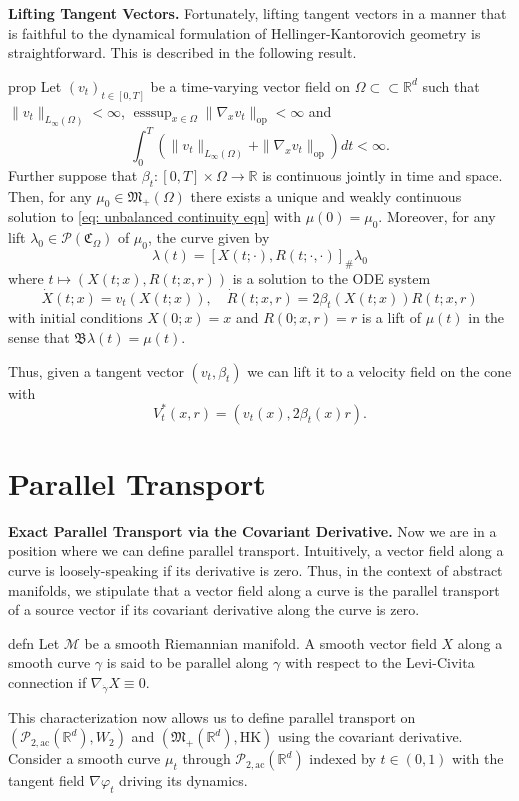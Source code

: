 \documentclass{article}
\newcommand{\man}{\mathcal{M}}
\DeclareMathOperator{\esssup}{esssup}
\newcommand{\pac}{\mathcal{P}_{2, \text{ac}}(\mathbb{R}^d)}
\newcommand{\posm}{\mathfrak{M}_+(\mathbb{R}^d)}
\begin{document}
\noindent \textbf{Lifting Tangent Vectors.} Fortunately, lifting tangent vectors in a manner that is faithful to the dynamical formulation of Hellinger-Kantorovich geometry is straightforward. This is described in the following result.

\begin{restatable}{prop}{} \label{lifting velocities}
    Let $(v_t)_{t \in [0, T]}$ be a time-varying vector field on $\Omega \subset \subset \mathbb{R}^d$ such that $\|v_t\|_{L_\infty(\Omega)} < \infty$, $\esssup_{x \in \Omega}\|\nabla_xv_t\|_{\text{op}} < \infty$ and 
    \[\int_0^T \left(\|v_t\|_{L_\infty(\Omega)} + \|\nabla_xv_t\|_{\text{op}}\right)dt < \infty.\]
    Further suppose that $\beta_t: [0, T] \times \Omega \rightarrow \mathbb{R}$ is continuous jointly in time and space. Then, for any $\mu_0 \in \mathfrak{M}_+(\Omega)$ there exists a unique and weakly continuous solution to \cref{eq: unbalanced continuity eqn} with $\mu(0) = \mu_0$. Moreover, for any lift $\lambda_0 \in \mathcal{P}(\mathfrak{C}_\Omega)$ of $\mu_0$, the curve given by 
    \[\lambda(t) = \left[X(t; \cdot), R(t; \cdot, \cdot)\right]_{\#} \lambda_0\]
    where $t \mapsto \left(X(t;x), R(t; x, r)\right)$ is a solution to the ODE system
    \[\dot X(t; x) = v_t(X(t;x)), \quad \dot R(t; x, r) = 2\beta_t(X(t; x))R(t; x, r)\]
    with initial conditions $X(0; x) = x$ and $R(0; x, r) = r$ is a lift of $\mu(t)$ in the sense that $\mathfrak{B}\lambda(t) = \mu(t)$. 
\end{restatable}
\noindent Thus, given a tangent vector $(v_t, \beta_t)$ we can lift it to a velocity field on the cone with 
\[V_t^*(x, r) = \left(v_t(x), 2\beta_t(x)r\right).\]

\section{Parallel Transport}

\textbf{Exact Parallel Transport via the Covariant Derivative.} Now we are in a position where we can define parallel transport. Intuitively, a vector field along a curve is  loosely-speaking if its derivative is zero. Thus, in the context of abstract manifolds, we stipulate that a vector field along a curve is the parallel transport of a source vector if its covariant derivative along the curve is zero.
\begin{restatable}{defn}{} \label{parallel transport on general manifolds}
    Let $\man$ be a smooth Riemannian manifold. A smooth vector field $X$ along a smooth curve $\gamma$ is said to be parallel along $\gamma$ with respect to the Levi-Civita connection if $\nabla_{\dot \gamma}X \equiv 0$.
\end{restatable}
This characterization now allows us to define parallel transport on $(\pac, W_2)$ and $(\posm, \text{HK})$ using the covariant derivative. Consider a smooth curve $\mu_t$ through $\pac$ indexed by $t \in (0, 1)$ with the tangent field $\nabla \varphi_t$ driving its dynamics. 
\end{document}
